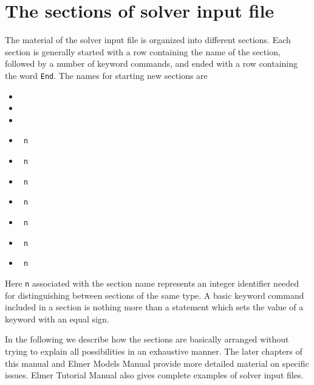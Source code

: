                                                                                                                  

\section{The sections of solver input file}

The material of the solver input file is organized into different sections.  
Each section is generally started with a row containing the name of the section, followed by a number of
keyword commands, and ended with a row containing the word {\tt End}. 
The names for starting new sections are
\begin{itemize}
\item {\tt {}}
\item {\tt {}}
\item {\tt {}}
\item {\tt {} n}
\item {\tt {} n}
\item {\tt {} n}
\item {\tt {} n}
\item {\tt {} n}
\item {\tt {} n}
\item {\tt {} n}
\end{itemize}
Here {\tt n} associated with the section name represents an integer identifier needed for distinguishing between 
sections of the same type. A basic keyword command included in a section
is nothing more than a statement which sets the value of a keyword
with an equal sign. 

In the following we describe how the sections are basically arranged without 
trying to explain all possibilities in an exhaustive manner. 
The later chapters of this manual and Elmer Models Manual provide more
detailed material on specific issues. Elmer Tutorial Manual also gives complete
examples of solver input files. 

